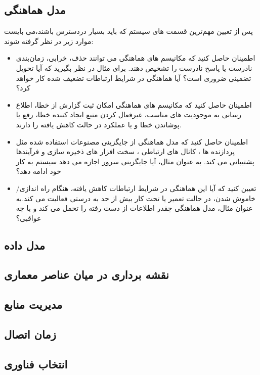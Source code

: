 \subsection{مدل هماهنگی}
پس از تعیین مهم‌ترین قسمت های سیستم که باید بسیار در‌دسترس باشند،می بایست موارد زیر در نظر گرفته شوند:
\begin{itemize}
\item
اطمینان حاصل کنید که مکانیسم های هماهنگی می توانند حذف، خرابی، زمان‌بندی نادرست یا پاسخ نادرست را تشخیص دهند. برای مثال در نظر بگیرید که آیا تحویل تضمینی ضروری است؟ آیا هماهنگی در شرایط ارتباطات تضعیف شده کار خواهد کرد؟
\item
اطمینان حاصل کنید که مکانیسم های هماهنگی امکان ثبت گزارش از خطا، اطلاع رسانی به موجودیت های مناسب، غیرفعال کردن منبع ایجاد کننده خطا، رفع یا پوشاندن خطا و یا عملکرد در حالت کاهش یافته را دارند.
\item
اطمینان حاصل کنید که مدل هماهنگی از جایگزینی مصنوعات استفاده شده مثل پردازنده ها ، کانال های ارتباطی ، سخت افزار های ذخیره سازی و فرآیندها پشتیبانی می کند. به عنوان مثال، آیا جایگزینی سرور اجازه می دهد سیستم به کار خود ادامه دهد؟
\item
تعیین کنید که آیا این هماهنگی در شرایط ارتباطات کاهش یافته، هنگام راه اندازی/ خاموش شدن، در حالت تعمیر یا تحت کار بیش از حد به درستی فعالیت می کند.به عنوان مثال، مدل هماهنگی چقدر اطلاعات از دست رفته را تحمل می کند و با چه عواقبی؟
\end{itemize}

\subsection{مدل داده}

\subsection{نقشه برداری در میان عناصر معماری}

\subsection{مدیریت منابع}

\subsection{زمان اتصال}

\subsection{انتخاب فناوری}




















